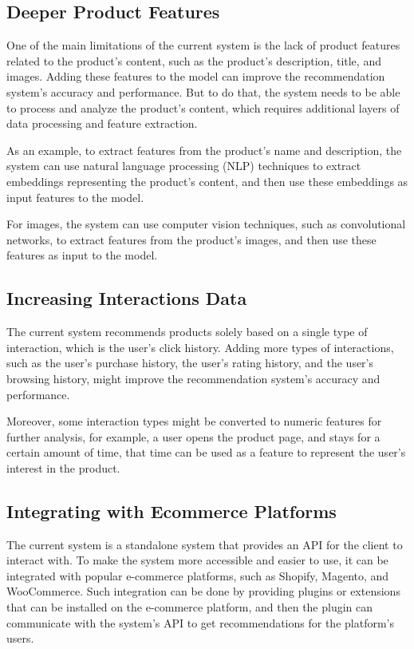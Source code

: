 \subsection{Deeper Product Features}

One of the main limitations of the current system is the lack of product features related to the product's content, such as the product's description, title, and images.
Adding these features to the model can improve the recommendation system's accuracy and performance. 
But to do that, the system needs to be able to process and analyze the product's content, which requires additional layers of data processing and feature extraction.

As an example, to extract features from the product's name and description, the system can use natural language processing (NLP) 
techniques to extract embeddings representing the product's content, and then use these embeddings as input features to the model.

For images, the system can use computer vision techniques, such as convolutional networks, to extract features from the product's images, and then use these features as input to the model.

\subsection{Increasing Interactions Data}

The current system recommends products solely based on a single type of interaction, which is the user's click history.
Adding more types of interactions, such as the user's purchase history, the user's rating history, and the user's browsing history, 
might improve the recommendation system's accuracy and performance.

Moreover, some interaction types might be converted to numeric features for further analysis,
 for example, a user opens the product page, and stays for a certain amount of time, 
 that time can be used as a feature to represent the user's interest in the product.

 \subsection{Integrating with Ecommerce Platforms}

The current system is a standalone system that provides an API for the client to interact with.
To make the system more accessible and easier to use, it can be integrated with popular e-commerce platforms, such as Shopify, Magento, and WooCommerce.
Such integration can be done by providing plugins or extensions that can be installed on the e-commerce platform, 
and then the plugin can communicate with the system's API to get recommendations for the platform's users.

